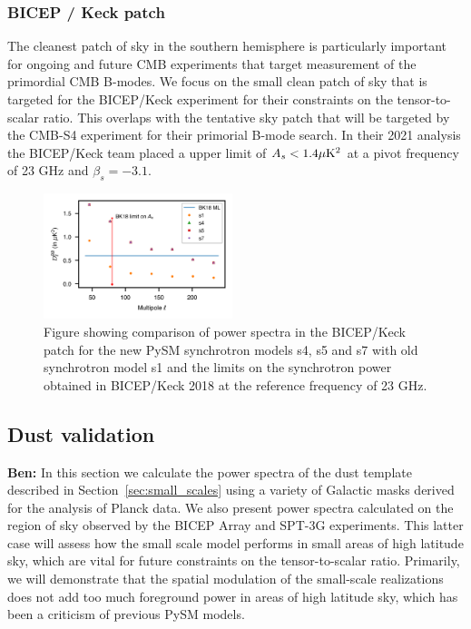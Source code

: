 \documentclass[twocolumn]{aastex631}
\begin{document}
\subsubsection{BICEP / Keck patch}
The cleanest patch of sky in the southern hemisphere is particularly important for ongoing and future CMB experiments that target measurement of the primordial CMB B-modes. We focus on the small clean patch of sky that is targeted for the BICEP/Keck experiment for their constraints on the tensor-to-scalar ratio. This overlaps with the tentative sky patch that will be targeted by the CMB-S4 experiment for their primorial B-mode search. In their 2021 analysis the BICEP/Keck team placed a upper limit of $A_s<1.4 \mu{\rm K}^2$ at a pivot frequency of 23 GHz and $\beta_s=-3.1$. 

\begin{figure}
    \centering
    \includegraphics[width=0.49\textwidth]{figures/Dlcomp_PySM3-4b8_BKpatch.png}
    \caption{Figure showing comparison of power spectra in the BICEP/Keck patch for the new PySM synchrotron models s4, s5 and s7 with old synchrotron model s1 and the limits on the synchrotron power obtained in BICEP/Keck 2018 \cite{} at the reference frequency of 23 GHz.}
    \label{fig:Dl_sync_BK}
\end{figure}


\subsection{Dust validation} \label{sec:dust_validation}

\textbf{Ben:} In this section we calculate the power spectra of the dust template described in Section~\ref{sec:small_scales} using a variety of Galactic masks derived for the analysis of Planck data. We also present power spectra calculated on the region of sky observed by the BICEP Array and SPT-3G experiments. This latter case will assess how the small scale model performs in small areas of high latitude sky, which are vital for future constraints on the tensor-to-scalar ratio. Primarily, we will demonstrate that the spatial modulation of the small-scale realizations does not add too much foreground power in areas of high latitude sky, which has been a criticism of previous PySM models. 
\end{document}
